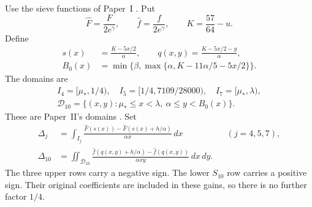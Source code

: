Use the sieve functions of Paper~I
\cite[(2.23), immediately before Theorem~2.6]{PaperI}. Put
\begin{equation}\label{eq:retB-hat-functions}
 \widehat F=\frac{F}{2e^\gamma},\qquad
 \widehat f=\frac{f}{2e^\gamma},\qquad
 K=\frac{57}{64}-u.
\end{equation}
Define
\begin{equation}\label{eq:retB-H6-domains}
\begin{aligned}
 s(x)&=\frac{K-5x/2}{\alpha},\qquad
 q(x,y)=\frac{K-5x/2-y}{\alpha},\\
 B_0(x)&=\min\{\beta,\max\{\alpha,K-11\alpha/5-5x/2\}\}.
\end{aligned}
\end{equation}
The domains are
\begin{equation}\label{eq:retB-H6-domain-sets}
\begin{gathered}
 I_4=[\mu_*,1/4),\quad I_5=[1/4,7109/28000),\quad
 I_7=[\mu_*,\lambda),\\
 \mathcal D_{10}=\{(x,y):\mu_*\le x<\lambda,\ \alpha\le y<B_0(x)\}.
\end{gathered}
\end{equation}
These are Paper~II's domains
\cite[(2.27), (2.29), (2.31), (2.38)--(2.40)]{PaperII}.
Set
\begin{equation}\label{eq:retB-H6-gains}
\begin{aligned}
 \Delta_j&=\int_{I_j}
  \frac{\widehat F(s(x))-\widehat F(s(x)+h/\alpha)}{\alpha x}\,dx
                      &&(j=4,5,7),\\
 \Delta_{10}&=\iint_{\mathcal D_{10}}
  \frac{\widehat f(q(x,y)+h/\alpha)-\widehat f(q(x,y))}
       {\alpha xy}\,dx\,dy.
\end{aligned}
\end{equation}
The three upper rows carry a negative sign.
The lower $S_{10}$ row carries a positive sign.
Their original coefficients are included in these gains,
so there is no further factor $1/4$.

